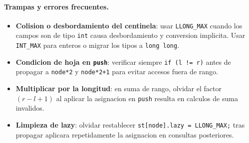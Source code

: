 \paragraph{Trampas y errores frecuentes.}
\begin{itemize}\setlength\itemsep{0pt}
	\item \textbf{Colision o desbordamiento del centinela}: usar \texttt{LLONG\_MAX} cuando los campos son de tipo \texttt{int} causa desbordamiento y conversion implicita. Usar \texttt{INT\_MAX} para enteros o migrar los tipos a \texttt{long long}.
	\item \textbf{Condicion de hoja en \texttt{push}}: verificar siempre \texttt{if (l != r)} antes de propagar a \texttt{node*2} y \texttt{node*2+1} para evitar accesos fuera de rango.
	\item \textbf{Multiplicar por la longitud}: en suma de rango, olvidar el factor $(r - l + 1)$ al aplicar la asignacion en \texttt{push} resulta en calculos de suma invalidos.
	\item \textbf{Limpieza de lazy}: olvidar restablecer \texttt{st[node].lazy = LLONG\_MAX;} tras propagar aplicara repetidamente la asignacion en consultas posteriores.
\end{itemize}

